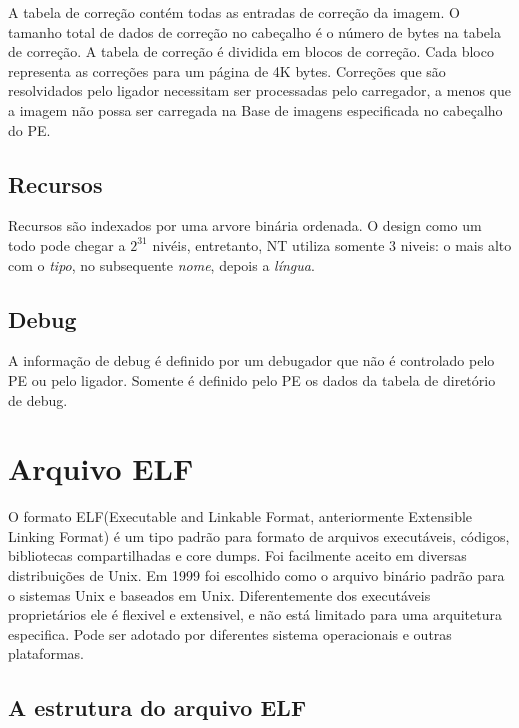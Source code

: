 A tabela de correção contém todas as entradas de correção da imagem.
O tamanho total de dados de correção no cabeçalho é o número de bytes
na tabela de correção. A tabela de correção é dividida em blocos de
correção. Cada bloco representa as correções para um página de 4K
bytes. Correções que são resolvidados pelo ligador necessitam ser
processadas pelo carregador, a menos que a imagem não possa ser carregada
na Base de imagens especificada no cabeçalho do PE.


\subsection{Recursos}


Recursos são indexados por uma arvore binária ordenada. O design
como um todo pode chegar a $2^{31}$ nivéis, entretanto, NT utiliza
somente 3 niveis: o mais alto com o \emph{tipo}, no subsequente \emph{nome},
depois a \emph{língua}.


\subsection{Debug}


A informação de debug é definido por um debugador que não é controlado
pelo PE ou pelo ligador. Somente é definido pelo PE os dados da tabela
de diretório de debug.


\section{Arquivo ELF}
   O formato ELF(Executable and Linkable Format, anteriormente Extensible Linking Format) é um tipo padrão para formato de arquivos executáveis, códigos, bibliotecas compartilhadas e core dumps. Foi facilmente aceito em diversas distribuições de Unix. 
   Em 1999 foi escolhido como o arquivo binário padrão para o sistemas Unix e baseados em Unix. Diferentemente dos executáveis proprietários ele é flexivel e extensivel, e não está limitado para uma arquitetura especifica. Pode ser adotado por diferentes sistema operacionais e outras plataformas.

\subsection{A estrutura do arquivo ELF}

